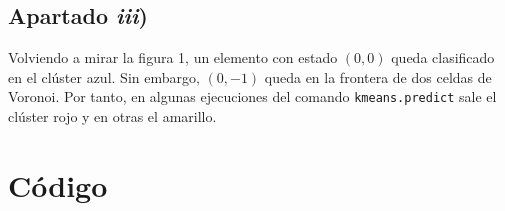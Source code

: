 \documentclass[a4paper]{article}
\begin{document}
	\subsection{Apartado \textit{iii})}
	Volviendo a mirar la figura 1, un elemento con estado $(0,0)$ queda clasificado en el clúster azul. Sin embargo, $(0,-1)$ queda en la frontera de dos celdas de Voronoi. Por tanto, en algunas ejecuciones del comando \verb+kmeans.predict+ sale el clúster rojo y en otras el amarillo.
	
	\newpage
	\section{Código}\label{codigo}
	
	
	
\end{document}
